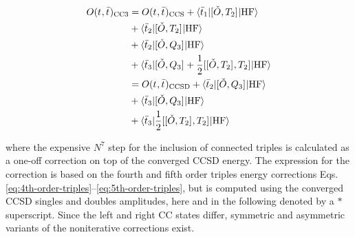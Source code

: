 \begin{equation}\label{eq:cc3-expectation-value}
  \begin{aligned}
  O(t_{}, \bar{t}_{})_\mathrm{CC3}
  &=
  O(t_{}, \bar{t}_{})_\mathrm{CCS}
  + \braket{\bar{t}_{1} | [ \check{O}, T_2 ]^{} | \mathrm{HF} } \\
  &+ \braket{\bar{t}_{2} | [ \check{O}, T_2 ]^{} | \mathrm{HF} } \\
  &+
  \braket{\bar{t}_{2} | [ \check{O}, Q_3 ]^{} | \mathrm{HF} } \\
  &+ \braket{\bar{t}_{3} |
     [ \check{O}, Q_3 ]^{}
   + \frac{1}{2}[ [ \check{O}, T_2 ]^{}, T_2 ]^{}
                     | \mathrm{HF} } \\
  &=
  O(t_{}, \bar{t}_{})_\mathrm{CCSD}
  +
  \braket{\bar{t}_{2} | [ \check{O}, Q_3 ]^{} | \mathrm{HF} } \\
  &+ \braket{\bar{t}_{3} |
     [ \check{O}, Q_3 ]^{}
                     | \mathrm{HF} } \\
  &+ \braket{\bar{t}_{3} |
     \frac{1}{2}[ [ \check{O}, T_2 ]^{}, T_2 ]^{}
                     | \mathrm{HF} }
  \end{aligned}
\end{equation}

 where the
expensive $N^7$ step for the inclusion of connected triples is
calculated as a one-off correction on top of the converged
\acrshort{CCSD} energy.
The expression for the correction is based on the fourth and fifth order
triples energy corrections Eqs.
\eqref{eq:4th-order-triples}--\eqref{eq:5th-order-triples}, but is
computed using the converged \acrshort{CCSD} singles and doubles
amplitudes,\autocite{Urban1985-xp, Raghavachari1989-bn, Bartlett1990-lk,
Watts1993-ff, Kucharski1998-qq, Kucharski1998-oi, Crawford1998-vj,
Taube2008-xv, Taube2008-oq} here and in the following denoted by a $*$
superscript.
Since the left and right \acrshort{CC} states differ, symmetric and
asymmetric variants of the noniterative corrections exist.

